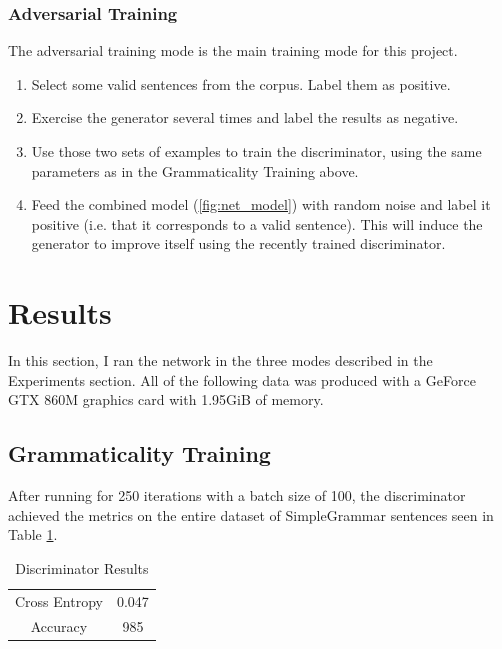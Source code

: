 \documentclass[11pt]{article}
\begin{document}
\subsubsection{Adversarial Training}

The adversarial training mode is the main training mode for this project.

\begin{enumerate}
    \item Select some valid sentences from the corpus. Label them as positive.
    \item Exercise the generator several times and label the results as negative.
    \item Use those two sets of examples to train the discriminator, using the same parameters as in the Grammaticality Training above.
    \item Feed the combined model (\ref{fig:net_model}) with random noise and label it positive (i.e. that it corresponds to a valid sentence). This will induce the generator to improve itself using the recently trained discriminator.
\end{enumerate}

\section{Results}

In this section, I ran the network in the three modes described in the Experiments section. All of the following data was produced with a GeForce GTX 860M graphics card with 1.95GiB of memory.

\subsection{Grammaticality Training}

After running for 250 iterations with a batch size of 100, the discriminator achieved the metrics on the entire dataset of SimpleGrammar sentences seen in Table \ref{tab:disc_results}.

\begin{table}[ht]
    \centering
    \begin{tabular}{c|c}
        \hline
        Cross Entropy & 0.047 \\
        Accuracy & 985 \\
    \end{tabular}
    \caption{Discriminator Results}
    \label{tab:disc_results}
\end{table}
\end{document}
